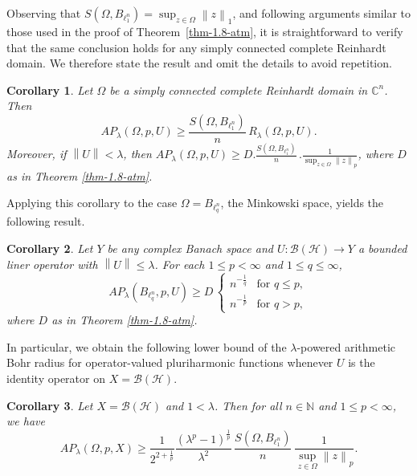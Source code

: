 \documentclass[a4paper,11pt, reqno]{amsart}
\newtheorem{cor}{Corollary}[section]
\theoremstyle{definition}
\newcommand{\norm}[1]{\left\lVert#1\right\rVert}
\begin{document}
Observing that $S(\Omega,B_{\ell^n_1})=\sup_{z \in \Omega} \norm{z}_{1}$, and following arguments similar to those used in the proof of Theorem~\ref{thm-1.8-atm}, it is straightforward to verify that the same conclusion holds for any simply connected complete Reinhardt domain. We therefore state the result and omit the details to avoid repetition.
\begin{cor} \label{cor-1.1-added}
Let $\Omega$ be a simply connected complete Reinhardt domain in $\mathbb{C}^n$. Then 
\begin{equation*}
	AP_\lambda(\Omega,p,U) \geq \frac{S(\Omega,B_{\ell^n_1})}{n} \, R_\lambda(\Omega,p,U).
\end{equation*}
Moreover, if $\norm{U}<\lambda$, then $AP_\lambda(\Omega,p,U) \geq D.\frac{S(\Omega,B_{\ell^n_1})}{n} \,. \frac{1}{\sup_{z \in \Omega}\norm{z}_{p}}$, where $D$ as in Theorem \ref{thm-1.8-atm}.
\end{cor}
Applying this corollary to the case $\Omega=B_{\ell^n_q}$, the Minkowski space, yields the following result. 
\begin{cor}
Let $Y$ be any complex Banach space and $U:\mathcal{B}(\mathcal{H})\rightarrow Y$ a bounded liner operator with $\norm{U} \leq \lambda$. For each $1\leq p<\infty$ and $1\leq q \leq\infty$,
\begin{equation*}
AP_\lambda(B_{\ell^n_q},p,U) \geq D\,
\begin{cases}	
	n^{- \frac{1}{q}} & \text{for $q\leq p$}, \\[2mm]
	 n^{ - \frac{1}{p}} & \text{for $q>p$},
\end{cases}
\end{equation*}
where $D$ as in Theorem \ref{thm-1.8-atm}.
\end{cor}
	In particular, we obtain the following lower bound of the $\lambda$-powered arithmetic Bohr radius for operator-valued pluriharmonic functions whenever $U$ is the identity operator on $X=\mathcal{B}(\mathcal{H})$.
	\begin{cor}
		Let $X=\mathcal{B}(\mathcal{H})$ and $1<\lambda$. Then for all $n\in \mathbb{N}$ and $1\leq p < \infty$, we have
		\begin{equation*}
			AP_{\lambda}(\Omega, p,X) \geq \frac{1}{2^{2+\frac{1}{p}}} \frac{\left(\lambda^p -1\right)^{\frac{1}{p}}}{\lambda^2}\, \frac{S(\Omega, B_{\ell^n_1})}{n}\, \frac{1}{\sup_{z \in \Omega}\norm{z}_{p}}.
		\end{equation*}
	\end{cor}
\end{document}
